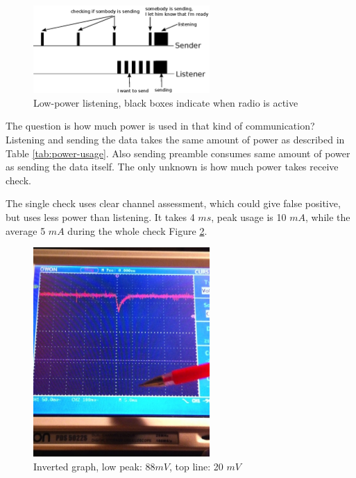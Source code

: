 \begin{figure}[h]
  \centering
  \includegraphics[width=0.6\textwidth]{diagrams/low_power_listening.eps}
  \caption{Low-power listening, black boxes indicate when radio is active}
  \label{fig:low_power_listening}
\end{figure}

The question is how much power is used in that kind of communication?
Listening and sending the data takes the same amount of power as described in Table \ref{tab:power-usage}.
Also sending preamble consumes same amount of power as sending the data itself.
The only unknown is how much power takes receive check.

The single check uses clear channel assessment, which could give false positive, but uses less power than listening.
It takes 4 $ ms $, peak usage is 10 $ mA $, while the average 5 $ mA $ during the whole check Figure \ref{fig:low_power_receive_check}.

\begin{figure}[h]
  \centering
  \includegraphics[width=0.6\textwidth]{img/low_power_receive_check.jpg}
  \caption{Inverted graph, low peak: $ 88 mV$, top line: 20 $ mV $}
  \label{fig:low_power_receive_check}
\end{figure}

